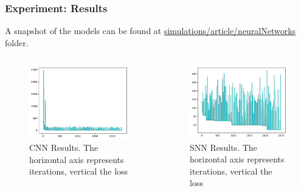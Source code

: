 \begin{frame}
	\frametitle{Experiment: Results}
	\par A snapshot of the models can be found at  \href{https://github.com/ensismoebius/deepLearnning/tree/main/simulations/article/neuralNetworks}{simulations/article/neuralNetworks} folder.
	\begin{columns}
		\begin{column}{0.5\textwidth}
			\begin{figure}
				\centering
				\includegraphics[width=\linewidth]{images/cnnResults}
				\caption[CNN Results]{CNN Results. The horizontal axis represents iterations, vertical the loss }
				\label{fig:cnnresults}
			\end{figure}
			
		\end{column}
		\begin{column}{0.5\textwidth}
			\begin{figure}
				\centering
				\includegraphics[width=\linewidth]{images/snnResults}
				\caption[SNN Results]{SNN Results. The horizontal axis represents iterations, vertical the loss }
				\label{fig:snnresults}
			\end{figure}
		\end{column}
	\end{columns}
\end{frame}
